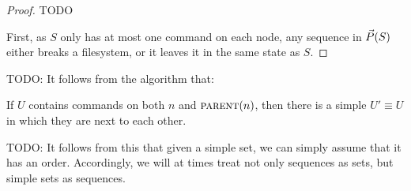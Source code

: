 \begin{proof}
TODO




First, as $S$ only has at most one command on each node,
any sequence in $\vec{P}({S})$ either breaks a filesystem,
or it leaves it in the same state as $S$.
\end{proof}






TODO:
It follows from the algorithm that:
\begin{mycor}\label{lemma:neighbor}
If $U$ contains commands on both $n$ and $\text{\normalfont\scshape{parent}}(n)$, then
there is a simple $U'\equiv U$ in which they are next to each other.
\end{mycor}


TODO:
It follows from this that given a simple set,
we can simply assume that it has an order.
Accordingly, we will at times treat not only sequences as sets,
but simple sets as sequences.

